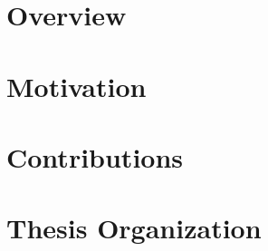 \label{chapter:introduction}

\section{Overview}
\section{Motivation}
\section{Contributions}
\section{Thesis Organization}